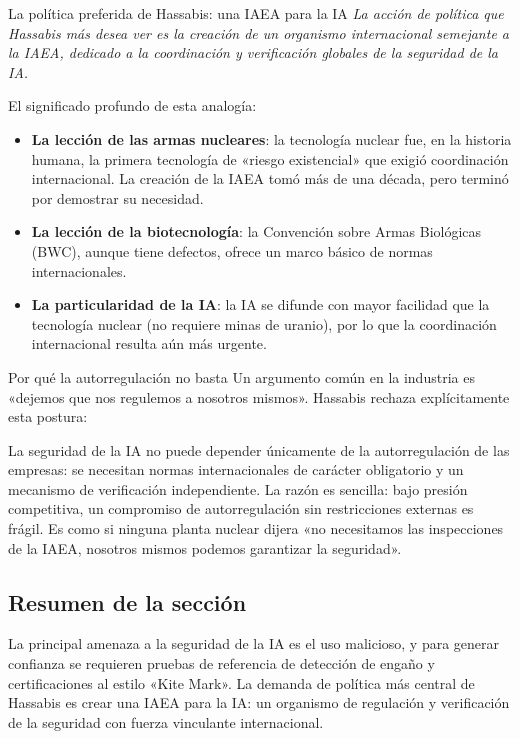 \begin{importantbox}{La política preferida de Hassabis: una IAEA para la IA}
\textit{La acción de política que Hassabis más desea ver es la creación de un organismo internacional semejante a la IAEA, dedicado a la coordinación y verificación globales de la seguridad de la IA.}

El significado profundo de esta analogía:
\begin{itemize}
    \item \textbf{La lección de las armas nucleares}: la tecnología nuclear fue, en la historia humana, la primera tecnología de «riesgo existencial» que exigió coordinación internacional. La creación de la IAEA tomó más de una década, pero terminó por demostrar su necesidad.
    \item \textbf{La lección de la biotecnología}: la Convención sobre Armas Biológicas (BWC), aunque tiene defectos, ofrece un marco básico de normas internacionales.
    \item \textbf{La particularidad de la IA}: la IA se difunde con mayor facilidad que la tecnología nuclear (no requiere minas de uranio), por lo que la coordinación internacional resulta aún más urgente.
\end{itemize}
\end{importantbox}

\begin{warningbox}{Por qué la autorregulación no basta}
Un argumento común en la industria es «dejemos que nos regulemos a nosotros mismos». Hassabis rechaza explícitamente esta postura:

La seguridad de la IA no puede depender únicamente de la autorregulación de las empresas: se necesitan normas internacionales de carácter obligatorio y un mecanismo de verificación independiente. La razón es sencilla: bajo presión competitiva, un compromiso de autorregulación sin restricciones externas es frágil. Es como si ninguna planta nuclear dijera «no necesitamos las inspecciones de la IAEA, nosotros mismos podemos garantizar la seguridad».
\end{warningbox}

\subsection{Resumen de la sección}

La principal amenaza a la seguridad de la IA es el uso malicioso, y para generar confianza se requieren pruebas de referencia de detección de engaño y certificaciones al estilo «Kite Mark». La demanda de política más central de Hassabis es crear una IAEA para la IA: un organismo de regulación y verificación de la seguridad con fuerza vinculante internacional.

